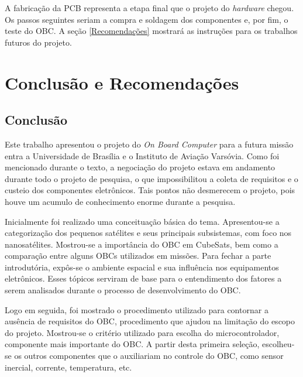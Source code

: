 A fabricação da PCB representa a etapa final que o projeto do \textit{hardware} chegou. Os passos seguintes seriam a compra e soldagem dos componentes e, por fim, o teste do OBC. A seção \ref{Recomendações} mostrará as instruções para os trabalhos futuros do projeto.

\chapter[Conclusão e Recomendações]{Conclusão e Recomendações}

\section{Conclusão}

Este trabalho apresentou o projeto do \textit{On Board Computer} para a futura missão entra a Universidade de Brasília e o Instituto de Aviação Varsóvia. Como foi mencionado durante o texto, a negociação do projeto estava em andamento durante todo o projeto de pesquisa, o que impossibilitou a coleta de requisitos e o custeio dos componentes eletrônicos. Tais pontos não desmerecem o projeto, pois houve um acumulo de conhecimento enorme durante a pesquisa. 

Inicialmente foi realizado uma conceituação básica do tema. Apresentou-se a categorização dos pequenos satélites e seus principais subsistemas, com foco nos nanosatélites. Mostrou-se a importância do OBC em CubeSats, bem como a comparação entre alguns OBCs utilizados em missões.  Para fechar a parte introdutória, expôs-se o ambiente espacial e sua influência nos equipamentos eletrônicos. Esses tópicos serviram de base para o entendimento dos fatores a serem analisados durante o processo de desenvolvimento do OBC.

Logo em seguida, foi mostrado o procedimento utilizado para contornar a ausência de requisitos do OBC, procedimento que ajudou na limitação do escopo do projeto. Mostrou-se o critério utilizado para escolha do microcontrolador, componente mais importante do OBC. A partir desta primeira seleção, escolheu-se os outros componentes que o auxiliariam no controle do OBC, como sensor inercial, corrente, temperatura, etc. 

